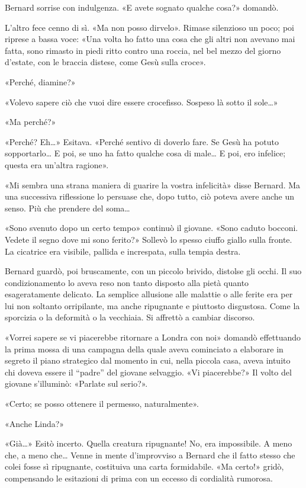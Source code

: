 \documentclass[
a5paper, %
10pt, %
twoside, 
onecolumn, %
openany, %
]{memoir}
\begin{document}
Bernard sorrise con indulgenza. «E avete sognato qualche cosa?» domandò.

L’altro fece cenno di sì. «Ma non posso dirvelo». Rimase silenzioso un poco; poi riprese a bassa voce: «Una volta ho fatto una cosa che gli altri non avevano mai fatta, sono rimasto in piedi ritto contro una roccia, nel bel mezzo del giorno d’estate, con le braccia distese, come Gesù sulla croce».

«Perché, diamine?»

«Volevo sapere ciò che vuoi dire essere crocefisso. Sospeso là sotto il sole…»

«Ma perché?»

«Perché? Eh…» Esitava. «Perché sentivo di doverlo fare. Se Gesù ha potuto sopportarlo… E poi, se uno ha fatto qualche cosa di male… E poi, ero infelice; questa era un’altra ragione».

«Mi sembra una strana maniera di guarire la vostra infelicità» disse Bernard. Ma una successiva riflessione lo persuase che, dopo tutto, ciò poteva avere anche un senso. Più che prendere del soma…

«Sono svenuto dopo un certo tempo» continuò il giovane. «Sono caduto bocconi. Vedete il segno dove mi sono ferito?» Sollevò lo spesso ciuffo giallo sulla fronte. La cicatrice era visibile, pallida e increspata, sulla tempia destra.

Bernard guardò, poi bruscamente, con un piccolo brivido, distolse gli occhi. Il suo condizionamento lo aveva reso non tanto disposto alla pietà quanto esageratamente delicato. La semplice allusione alle malattie o alle ferite era per lui non soltanto orripilante, ma anche ripugnante e piuttosto disgustosa. Come la sporcizia o la deformità o la vecchiaia. Si affrettò a cambiar discorso.

«Vorrei sapere se vi piacerebbe ritornare a Londra con noi» domandò effettuando la prima mossa di una campagna della quale aveva cominciato a elaborare in segreto il piano strategico dal momento in cui, nella piccola casa, aveva intuito chi doveva essere il “padre” del giovane selvaggio. «Vi piacerebbe?» Il volto del giovane s’illuminò: «Parlate sul serio?».

«Certo; se posso ottenere il permesso, naturalmente».

«Anche Linda?»

«Già…» Esitò incerto. Quella creatura ripugnante! No, era impossibile. A meno che, a meno che… Venne in mente d’improvviso a Bernard che il fatto stesso che colei fosse sì ripugnante, costituiva una carta formidabile. «Ma certo!» gridò, compensando le esitazioni di prima con un eccesso di cordialità rumorosa.
\end{document}
